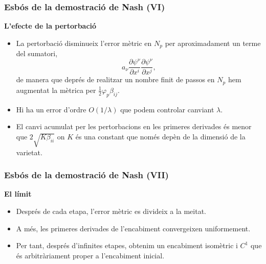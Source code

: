 \documentclass[10pt]{beamer}
\begin{document}
\begin{frame}
    \frametitle{Esbós de la demostració de Nash (VI)}
    
    \textbf{L'efecte de la pertorbació}
    \begin{itemize}
        \item La pertorbació disminueix l'error mètric en $N_p$ per aproximadament un terme del sumatori, $$a_\nu\frac{\partial\psi^\nu}{\partial x^i}\frac{\partial\psi^\nu}{\partial x^j},$$ de manera que deprés de realitzar un nombre finit de passos en $N_p$ hem augmentat la mètrica per $\frac12\varphi_p\beta_{ij}$.
        \item Hi ha un error d'ordre $O(1/\lambda)$ que podem controlar canviant $\lambda$.
        \item El canvi acumulat per les pertorbacions en les primeres derivades és menor que $2\sqrt{K\beta_{ii}}$ on $K$ és una constant que només depèn de la dimensió de la varietat.
    \end{itemize}
\end{frame}

\begin{frame}
    \frametitle{Esbós de la demostració de Nash (VII)}
    
    \textbf{El límit}
    \begin{itemize}
        \item Després de cada etapa, l'error mètric es divideix a la meitat.
        \item A més, les primeres derivades de l'encabiment convergeixen uniformement.
        \item Per tant, després d'infinites etapes, obtenim un encabiment isomètric i $C^1$ que és arbitràriament proper a l'encabiment inicial.
    \end{itemize}
\end{frame}
\end{document}
